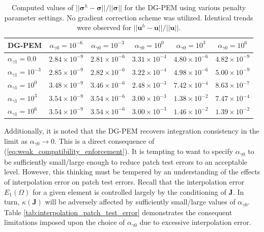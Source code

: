 \begin{table}[!ht]
  \begin{center}
    \begin{tabular}{| l || c | c | c | c | c |}
    \hline
    DG-PEM & $\alpha_{\gamma0} = 10^{-6}$ & $\alpha_{\gamma0} = 10^{-3}$ & $\alpha_{\gamma0} = 10^{0}$ & $\alpha_{\gamma0} = 10^{3}$ & $\alpha_{\gamma0} = 10^{6}$ \\ \hline \hline
    	$\alpha_{\gamma1} = 0.0$ & $2.84 \times 10^{-9}$ & $2.81 \times 10^{-6}$ & $3.31 \times 10^{-4}$ & $4.80 \times 10^{-6}$ & $4.82 \times 10^{-9}$ \\ \hline
    $\alpha_{\gamma1} = 10^{-3}$ & $2.85 \times 10^{-9}$ & $2.82 \times 10^{-6}$ & $3.22 \times 10^{-4}$ & $4.98 \times 10^{-6}$ & $5.00 \times 10^{-9}$ \\ \hline
    $\alpha_{\gamma1} = 10^{0}$ & $3.48 \times 10^{-9}$ & $3.46 \times 10^{-6}$ & $2.48 \times 10^{-3}$ & $7.42 \times 10^{-4}$ & $8.63 \times 10^{-7}$ \\ \hline
    $\alpha_{\gamma1} = 10^{3}$ & $3.54 \times 10^{-9}$ & $3.54 \times 10^{-6}$ & $3.00 \times 10^{-3}$ & $1.38 \times 10^{-2}$ & $7.47 \times 10^{-4}$ \\ \hline
    $\alpha_{\gamma1} = 10^{6}$ & $3.54 \times 10^{-9}$ & $3.54 \times 10^{-6}$ & $3.00 \times 10^{-3}$ & $1.46 \times 10^{-2}$ & $1.39 \times 10^{-2}$ \\
    \hline
    \end{tabular}
    \caption{Computed values of $||\boldsymbol{\sigma}^h - \boldsymbol{\sigma}|| / ||\boldsymbol{\sigma}||$ for the DG-PEM using various penalty parameter settings. No gradient correction scheme was utilized. Identical trends were observed for $||\bm{u}^h - \bm{u}|| / ||\bm{u}||$.}
    \vspace{-5pt}
    \label{tab:linear_patch_test_parameter_study}
    \vspace{-10pt}
  \end{center}
\end{table}

Additionally, it is noted that the DG-PEM recovers integration consistency in the limit as $\alpha_{\gamma0} \rightarrow 0$. This is a direct consequence of (\ref{eq:weak_compatibility_enforcement}). It is tempting to want to specify $\alpha_{\gamma0}$ to be sufficiently small/large enough to reduce patch test errors to an acceptable level. However, this thinking must be tempered by an understanding of the effects of interpolation error on patch test errors. Recall that the interpolation error $E_1 (\Omega)$ for a given element is controlled largely by the conditioning of $\bm{J}$. In turn, $\kappa (\bm{J})$ will be adversely affected by sufficiently small/large values of $\alpha_{\gamma0}$. Table \ref{tab:interpolation_patch_test_error} demonstrates the consequent limitations imposed upon the choice of $\alpha_{\gamma0}$ due to excessive interpolation error.

